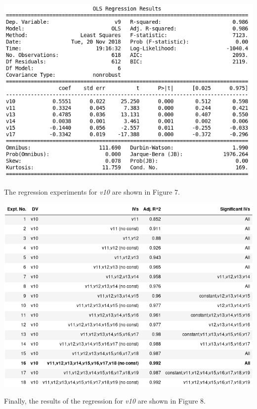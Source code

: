 \documentclass[12pt,a4paper]{article}
\begin{document}
\includegraphics[scale=0.5]{v9_exp.png}
\begingroup
{}
\endgroup
\hfill\break

The regression experiments for \textit{v10} are shown in Figure 7.

\includegraphics[scale=0.5]{v10_reg.png}
\begingroup
{}
\endgroup

Finally, the results of the regression for \textit{v10} are shown in Figure 8.\\
\end{document}
